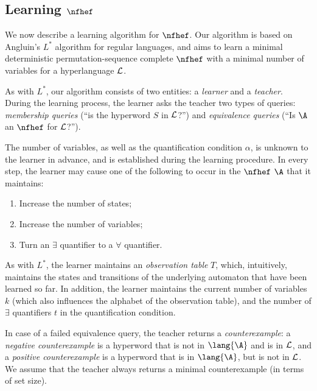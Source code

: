 \subsection{Learning $\nfhef$}

We now describe a learning algorithm for $\nfhef$.
Our algorithm is based on Angluin's $L^*$ algorithm \cite{Angluin87} for regular languages, and aims to learn a minimal deterministic permutation-sequence complete $\nfhef$ with a minimal number of variables for a hyperlanguage $\cal L$.

As with $L^*$, our algorithm consists of two entities: a {\em learner} and a {\em teacher}.
During the learning process, the learner asks the teacher two types of queries: {\em membership queries} (``is the hyperword $S$ in $\cal L$?'') and {\em equivalence queries} (``Is $\A$ an $\nfhef$ for $\cal L$?'').


The number of variables, as well as the quantification condition $\alpha$, is unknown to the learner in advance, and is established during the learning procedure. 
In every step, the learner may cause one of the following to occur in the $\nfhef$ $\A$ that it maintains:
\begin{enumerate}
    \item Increase the number of states;
    \item Increase the number of variables;
    \item Turn an $\exists$ quantifier to a $\forall$ quantifier.
\end{enumerate}

As with $L^*$, the learner maintains an {\em observation table} $T$, which, intuitively, maintains the states and transitions of the underlying automaton that have been learned so far. In addition, the learner maintains the current number of variables $k$ (which also influences the alphabet of the observation table), and the number of $\exists$ quantifiers $t$ in the quantification condition. 

In case of a failed equivalence query, the teacher returns a {\em counterexample}: a {\em negative counterexample} is a hyperword that is not in $\lang{\A}$ and is in $\cal L$, and a {\em positive counterexample} is a hyperword that is in $\lang{\A}$, but is not in $\cal L$. We assume that the teacher always returns a minimal counterexample (in terms of set size).

